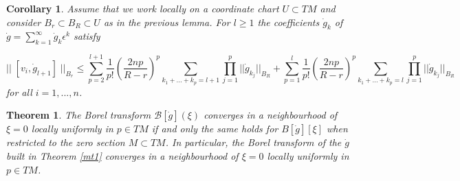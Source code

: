 \documentclass[10pt,a4paper]{amsart}
\newtheorem{theorem}{Theorem}
\newtheorem{corollary}{Corollary}
\begin{document}
\begin{corollary}\label{keycol} Assume that we work locally on a coordinate chart $U\subset TM$ and consider $B_r\subset B_R\subset U$ as in the previous lemma. For $l\geq 1$ the coefficients $\dot{g}_{k}$ of $\dot{g}=\sum_{k=1}^{\infty}\dot{g}_k\epsilon^k$ satisfy

\begin{equation*}
    ||\;[v_i,\dot{g}_{l+1}]\;||_{B_r} \leq \sum_{p=2}^{l+1}\frac{1}{p!}\left(\frac{2np}{R-r}\right)^p\sum_{k_1+...+k_p=l+1}\prod_{j=1}^{p}||\dot{g}_{k_j}||_{B_R}+\sum_{p=1}^{l}\frac{1}{p!}\left(\frac{2np}{R-r}\right)^p\sum_{k_1+...+k_p=l}\prod_{j=1}^{p}||\dot{g}_{k_j}||_{B_R}
\end{equation*}
for all $i=1,...,n$.
\end{corollary}

\begin{theorem}\label{mt2}
The Borel transform $\mathcal{B}[\dot{g}](\xi)$ converges in a neighbourhood of $\xi=0$ locally uniformly in $p\in TM$ if and only the same holds for $B[\dot{g}][\xi]$ when restricted to the zero section $M\subset TM$. In particular, the Borel transform of the $\dot{g}$ built in Theorem \ref{mt1} converges in a neighbourhood of $\xi=0$ locally uniformly in $p\in TM$.
\end{theorem}
\end{document}
